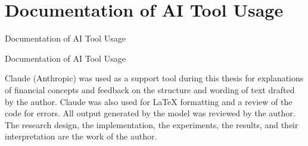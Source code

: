\clearpage
\section*{Documentation of AI Tool Usage}
%
  {Documentation of AI Tool Usage}
%
{Documentation of AI Tool Usage}

Claude (Anthropic) was used as a support tool during this thesis for explanations of financial concepts and feedback on the structure and wording of text drafted by the author. Claude was also used for LaTeX formatting and a review of the code for errors. All output generated by the model was reviewed by the author. The research design, the implementation, the experiments, the results, and their interpretation are the work of the author.